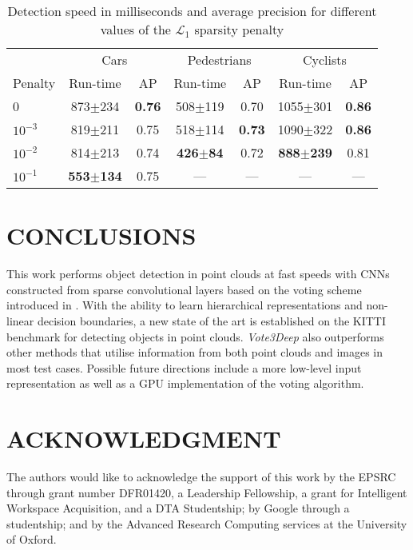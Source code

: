 \documentclass[letterpaper, 10 pt, conference]{tex_style/ieeeconf}
\begin{document}
\begin{table}
    \parbox[b!]{\columnwidth}{
    \centering
\caption{Detection speed in milliseconds and average precision for different values of the $\mathcal{L}_1$ sparsity penalty}
\begin{tabularx}{\columnwidth}{l c c c c c c}
        \toprule
        & \multicolumn{2}{c}{Cars} & \multicolumn{2}{c}{Pedestrians} & \multicolumn{2}{c}{Cyclists} \\
        \cmidrule(r){2-3} \cmidrule(lr){4-5} \cmidrule(l){6-7}
        Penalty & Run-time & AP & Run-time & AP & Run-time & AP \\
        \midrule
        0           & 873$\pm$234                   & \textbf{0.76} & 508$\pm$119                   & 0.70          & 1055$\pm$301                  & \textbf{0.86} \\
        \midrule
        $10^{-3}$   & 819$\pm$211                   & 0.75          & 518$\pm$114                   & \textbf{0.73} & 1090$\pm$322                  & \textbf{0.86} \\
        $10^{-2}$   & 814$\pm$213                   & 0.74          & \textbf{426}$\pm$\textbf{84}  & 0.72          & \textbf{888}$\pm$\textbf{239} & 0.81 \\
        $10^{-1}$   & \textbf{553}$\pm$\textbf{134} & 0.75          & ---                           & ---           & ---                           & --- \\
        \bottomrule
    \end{tabularx}
    \label{tab:sparsity}}
\end{table} \section{CONCLUSIONS}
\label{sec:conc}

This work performs object detection in point clouds at fast speeds with CNNs constructed from sparse convolutional layers based on the voting scheme introduced in \cite{wang2015voting}.
With the ability to learn hierarchical representations and non-linear decision boundaries, a new state of the art is established on the KITTI benchmark for detecting objects in point clouds.
\emph{Vote3Deep} also outperforms other methods that utilise information from both point clouds and images in most test cases.
Possible future directions include a more low-level input representation as well as a GPU implementation of the voting algorithm. 
\balance


\section*{ACKNOWLEDGMENT}

The authors would like to acknowledge the support of this work by the EPSRC through grant number DFR01420, a Leadership Fellowship, a grant for Intelligent Workspace Acquisition, and a DTA Studentship; by Google through a studentship; and by the Advanced Research Computing services at the University of Oxford.
                                  


\end{document}
